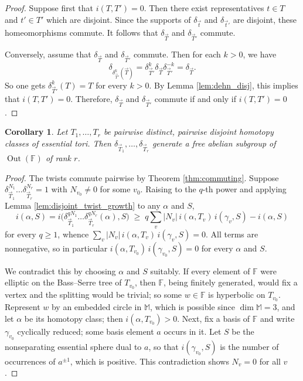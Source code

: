 \documentclass[12pt,a4paper]{amsart}
\numberwithin{equation}{section}
\DeclareMathOperator{\Out}{Out}
\newcommand{\FF}{\mathbb{F}}
\newcommand{\MM}{\mathbb{M}}
\theoremstyle{plain}
\newtheorem{corollary}[theorem]{Corollary}
\theoremstyle{definition}
\theoremstyle{remark}
\begin{document}
\begin{proof}
    Suppose first that \(i(T,T') = 0\).  
    Then there exist representatives \(t \in T\) and \(t' \in T'\) which are disjoint.  
    Since the supports of \(\delta_{\vec{t}}\) and \(\delta_{\vec{t}'}\) are disjoint, these homeomorphisms commute.  
    It follows that \(\delta_{\vec{T}}\) and \(\delta_{\vec{T}'}\) commute.  
    
    Conversely, assume that \(\delta_{\vec{T}}\) and \(\delta_{\vec{T}'}\) commute.  
    Then for each $k > 0$, we have
    \[
        \delta_{\delta_{\vec{T}'}^k(\vec{T})} = \delta_{\vec{T}'}^k \delta_{\vec{T}} \delta_{\vec{T}'}^{-k} = \delta_{\vec{T}}.
    \]
    So one gets \(\delta_{\vec{T}'}^k(T) = T\) for every $k > 0$.
    By Lemma \ref{lem:dehn_disj}, this implies that \(i(T,T') = 0\).  
    Therefore, \(\delta_{\vec{T}}\) and \(\delta_{\vec{T}'}\) commute if and only if \(i(T,T') = 0\).
\end{proof}

\begin{corollary} \label{cor:disjoint_twists_free_abelian}
    Let $T_1, \dots, T_r$ be pairwise distinct, pairwise disjoint homotopy classes of essential tori.
    Then $\delta_{\vec T_1}, \dots, \delta_{\vec T_r}$ generate a free abelian subgroup of $\Out(\FF)$ of rank $r$.
\end{corollary}

\begin{proof}
    The twists commute pairwise by Theorem \ref{thm:commuting}.
    Suppose $\delta_{\vec T_1}^{N_1} \dots \delta_{\vec T_r}^{N_r} = 1$ with $N_{v_0} \ne 0$ for some $v_0$.
    Raising to the $q$-th power and applying Lemma \ref{lem:disjoint_twist_growth} to any $\alpha$ and $S$,
    \[
        i(\alpha, S)
        = i\bigl(\delta_{\vec T_1}^{q N_1} \dots \delta_{\vec T_r}^{q N_r}(\alpha), S\bigr)
        \;\ge\; q \sum_{v} \lvert N_v \rvert \, i(\alpha, T_v) \, i(\gamma_v, S) - i(\alpha, S)
    \]
    for every $q \ge 1$, whence $\sum_{v} \lvert N_v \rvert \, i(\alpha, T_v) \, i(\gamma_v, S) = 0$.
    All terms are nonnegative, so in particular $i(\alpha, T_{v_0}) \, i(\gamma_{v_0}, S) = 0$ for every $\alpha$ and $S$.

    We contradict this by choosing $\alpha$ and $S$ suitably.
    If every element of $\FF$ were elliptic on the Bass--Serre tree of $T_{v_0}$, then $\FF$, being finitely generated, would fix a vertex and the splitting would be trivial; so some $w \in \FF$ is hyperbolic on $T_{v_0}$.
    Represent $w$ by an embedded circle in $\MM$, which is possible since $\dim \MM = 3$, and let $\alpha$ be its homotopy class; then $i(\alpha, T_{v_0}) > 0$.
    Next, fix a basis of $\FF$ and write $\gamma_{v_0}$ cyclically reduced; some basis element $a$ occurs in it.
    Let $S$ be the nonseparating essential sphere dual to $a$, so that $i(\gamma_{v_0}, S)$ is the number of occurrences of $a^{\pm 1}$, which is positive.
    This contradiction shows $N_v = 0$ for all $v$.
\end{proof}
\end{document}
